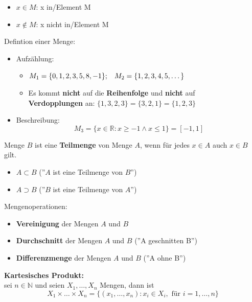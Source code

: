 \documentclass[12pt]{article}
\begin{document}
\begin{itemize}
    \item $x \in M$: x in/Element M
    \item $x \notin M$: x nicht in/Element M
\end{itemize}
\vspace{1ex}
Defintion einer Menge:
\begin{itemize}
    \item Aufzählung:
    \begin{itemize}
        \item[] $M_1 = \{0, 1, 2, 3, 5, 8, -1\}; \hspace{2ex} M_2 = \{1, 2, 3, 4, 5, \dots\}$
        \item[] Es kommt \textbf{nicht} auf die \textbf{Reihenfolge} und \textbf{nicht} auf \\ \textbf{Verdopplungen} an:
        $\{1, 3, 2, 3\} = \{3, 2, 1\} = \{1, 2, 3\}$
    \end{itemize}
    \item Beschreibung:
    \[M_3 = \{x \in \mathbb{R} : x \geq -1 \land x \leq 1\} = [-1, 1]\]
\end{itemize}
\vspace{1ex}
Menge $B$ ist eine \textbf{Teilmenge} von Menge $A$, wenn für jedes $x \in A$ auch $x \in B$ gilt.
\begin{itemize}
    \item $A \subset B$ (''$A$ ist eine Teilmenge von $B$'')
    \item $A \supset B$ (''$B$ ist eine Teilmenge von $A$'')
\end{itemize}
\vspace{1ex}
Mengenoperationen:
\begin{itemize}
    \item \textbf{Vereinigung} der Mengen $A$ und $B$
    \item \textbf{Durchschnitt} der Mengen $A$ und $B$
     (''A geschnitten B'')
    \item \textbf{Differenzmenge} der Mengen $A$ und $B$
     (''A ohne B'')
\end{itemize}
\vspace{1ex}
\textbf{Kartesisches Produkt:} \\
sei $n \in \mathbb{N}$ und seien $X_1, \dots, X_n$ Mengen, dann ist
\[X_1 \times \dots \times X_n = \{(x_1, \dots, x_n) : x_i \in X_i, \text{ für } i = 1,\dots,n\}\]
\end{document}
